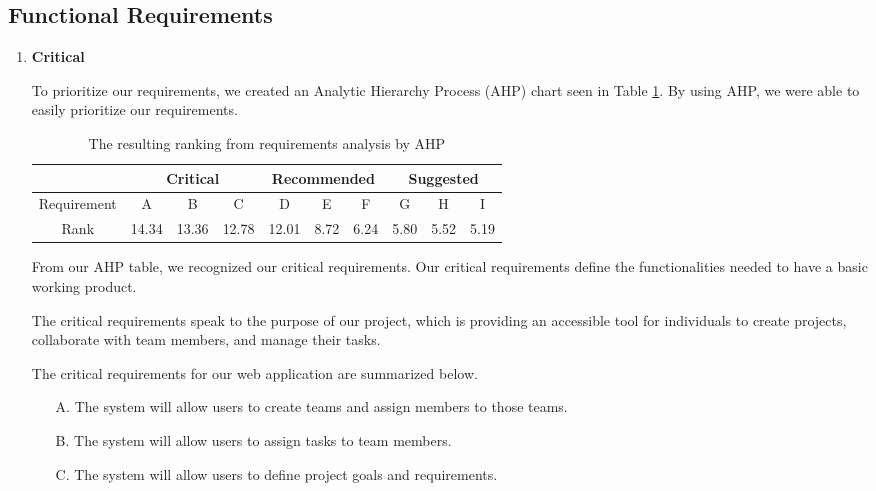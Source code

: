 \subsection{Functional Requirements}
\begin{enumerate}
\item \textbf{Critical}
\par To prioritize our requirements, we created an Analytic Hierarchy Process (AHP) chart seen in Table \ref{ahp}. By using AHP, we were able to easily prioritize our requirements.
\FloatBarrier
\begin{table}[ht]
\centering
\begin{tabular}{|c|c|c|c|c|c|c|c|c|c|}
	\hline
	\multicolumn{1}{|c|}{} & \multicolumn{3}{|c|}{\bfseries Critical} & \multicolumn{3}{|c|}{\bfseries Recommended} & \multicolumn{3}{|c|}{\bfseries Suggested} \\ 
	\hline
	Requirement & A & B & C & D & E & F & G & H & I  \\
	\hline
	Rank & 14.34 & 13.36 & 12.78 & 12.01 & 8.72 & 6.24 & 5.80 & 5.52 & 5.19 \\
	\hline
\end{tabular}
\caption{The resulting ranking from requirements analysis by AHP}
\label{ahp}
\end{table}
\FloatBarrier

\par From our AHP table, we recognized our critical requirements. Our critical requirements define the functionalities needed to have a basic working product. 

\par The critical requirements speak to the purpose of our project, which is providing an accessible tool for individuals to create projects, collaborate with team members, and manage their tasks.

\par The critical requirements for our web application are summarized below.
	\begin{enumerate}
	\item[A.] The system will allow users to create teams and assign members to those teams.
	\item[B.] The system will allow users to assign tasks to team members.
	\item[C.] The system will allow users to define project goals and requirements.


\end{enumerate}
\end{enumerate}
